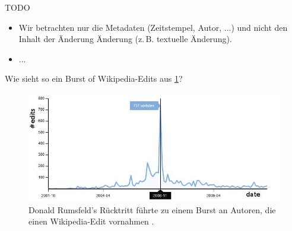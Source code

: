 TODO
    \begin{itemize}
        \item Wir betrachten nur die Metadaten (Zeitstempel, Autor, ...) und nicht den Inhalt der Änderung Änderung (z.\,B. textuelle Änderung).
        \item ...
    \end{itemize}
    Wie sieht so ein Burst of Wikipedia-Edits aus \ref{fig:donald_rumsfelds_resignation_burst}?


\begin{figure}[h]
    \includegraphics[width=.5\textwidth]{images/Extracting_EventRelated_Information_from_Article.jpg}
    \caption{Donald Rumsfeld’s Rücktritt führte zu einem Burst an Autoren, die einen Wikipedia-Edit vornahmen \cite{10.1007978-3-642-36973-5_22}.}
    \label{fig:donald_rumsfelds_resignation_burst}
\end{figure}